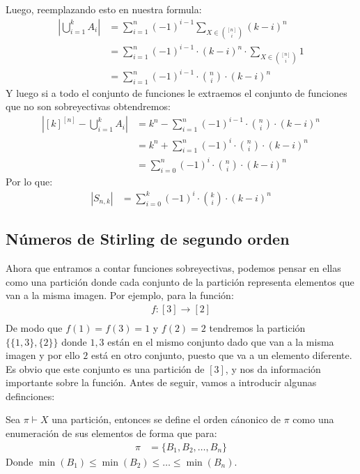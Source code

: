 \documentclass[12pt,a4paper,oneside]{memoir}
\begin{document}
Luego, reemplazando esto en nuestra formula:
\begin{align*}
    \left|\bigcup_{i = 1}^k A_i\right| &= \sum_{i = 1}^n (-1)^{i-1} \sum_{X \in \binom{[n]}{i}} (k-i)^n\\
    &= \sum_{i = 1}^n (-1)^{i-1} \cdot (k-i)^n \cdot \sum_{X \in \binom{[n]}{i}} 1\\
    &= \sum_{i = 1}^n (-1)^{i-1} \cdot \binom{n}{i} \cdot (k-i)^n
\end{align*}
Y luego si a todo el conjunto de funciones le extraemos el conjunto de funciones que no son sobreyectivas obtendremos:
\begin{align*}
    \left|[k]^{[n]} - \bigcup_{i = 1}^k A_i \right| &= k^n - \sum_{i = 1}^n (-1)^{i-1} \cdot \binom{n}{i} \cdot (k-i)^n \\
    &= k^n + \sum_{i = 1}^n (-1)^i \cdot \binom{n}{i} \cdot (k-i)^n\\
    &= \sum_{i = 0}^n (-1)^i \cdot \binom{n}{i} \cdot (k-i)^n
\end{align*}
Por lo que:
\begin{align*}
    |S_{n, k}| &= \sum_{i = 0}^k (-1)^i \cdot \binom{k}{i} \cdot (k-i)^n
\end{align*}

\subsection*{Números de Stirling de segundo orden}
Ahora que entramos a contar funciones sobreyectivas, podemos pensar en ellas como una partición donde cada conjunto de la partición representa elementos que van a la misma imagen. Por ejemplo, para la función:
\begin{align*}
    f: [3] \to [2]\\
\end{align*}
De modo que $f(1) = f(3) = 1$ y $f(2) = 2$ tendremos la partición $\{\{1, 3\}, \{2\}\}$ donde $1, 3$ están en el mismo conjunto dado que van a la misma imagen y por ello $2$ está en otro conjunto, puesto que va a un elemento diferente. Es obvio que este conjunto es una partición de $[3]$, y nos da información importante sobre la función. Antes de seguir, vamos a introducir algunas definciones:

\begin{definition}
    Sea $\pi \vdash X$ una partición, entonces se define el orden cánonico de $\pi$ como una enumeración de sus elementos de forma que para:
    \begin{align*}
        \pi &= \{B_1, B_2, \dots, B_n\}
    \end{align*}
    Donde $\min(B_1) \le \min(B_2) \le \dots \le \min(B_n)$.
\end{definition}
\end{document}
